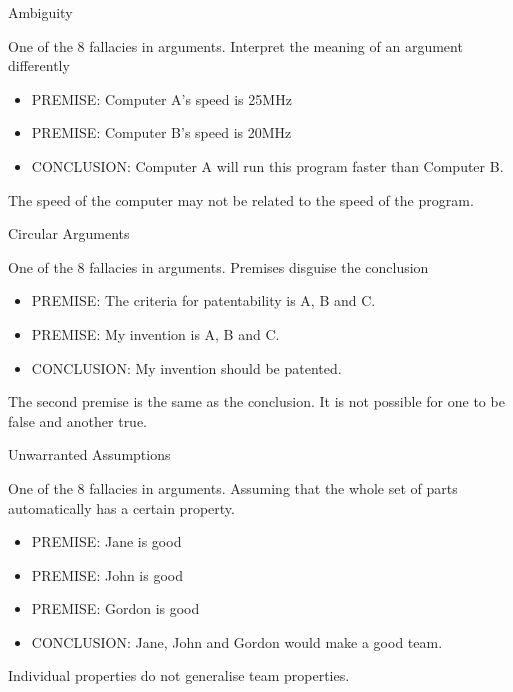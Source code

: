 \documentclass[]{../../DefinitionFormat}
\begin{document}
\begin{definition}{Ambiguity}
	\begin{summary}
		One of the 8 fallacies in arguments. Interpret the meaning of an argument differently
	\end{summary}
	
	\par
	\begin{itemize}[label={}]
		\item PREMISE: Computer A's speed is 25MHz
		\item PREMISE: Computer B's speed is 20MHz
		\item CONCLUSION: Computer A will run this program faster than Computer B.
	\end{itemize}
	\par The speed of the computer may not be related to the speed of the program.
\end{definition}

\begin{definition}{Circular Arguments}
	\begin{summary}
		One of the 8 fallacies in arguments. Premises disguise the conclusion
	\end{summary}
	\begin{itemize}[label={}]
		\item PREMISE: The criteria for patentability is A, B and C.
		\item PREMISE: My invention is A, B and C.
		\item CONCLUSION: My invention should be patented.
	\end{itemize}
	\par The second premise is the same as the conclusion. It is not possible for one to be false and another true.
\end{definition}

\begin{definition}{Unwarranted Assumptions}
	\begin{summary}
		One of the 8 fallacies in arguments. Assuming that the whole set of parts automatically has a certain property.
	\end{summary}
	\begin{itemize}[label={}]
		\item PREMISE: Jane is good
		\item PREMISE: John is good
		\item PREMISE: Gordon is good
		\item CONCLUSION: Jane, John and Gordon would make a good team.
	\end{itemize}
	\par Individual properties do not generalise team properties.
\end{definition}
\end{document}
